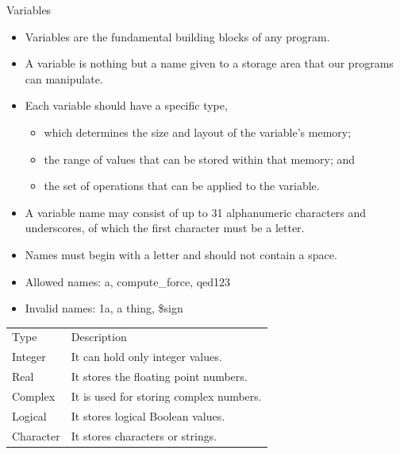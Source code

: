 \documentclass[10pt,t]{beamer}
\begin{document}
\begin{frame}{Variables}
  \begin{itemize}
  \item Variables are the fundamental building blocks of any program.
  \item A variable is nothing but a name given to a storage area that our programs can manipulate.
  \item Each variable should have a specific type,
    \begin{itemize}
    \item which determines the size and layout of the variable's memory;
    \item the range of values that can be stored within that memory; and
    \item the set of operations that can be applied to the variable.
    \end{itemize}
  \item A variable name may consist of up to 31 alphanumeric characters and underscores, of which the first character must be a letter.
  \item Names must begin with a letter and should not contain a space.
  \item Allowed names: a, compute\_force, qed123
  \item Invalid names: 1a, a thing, \$sign
  \end{itemize}
  \begin{center}
    \begin{tabular}{ll}
      \rowcolor{lublue}Type & Description \\
      \rowcolor{lulime!50}Integer & It can hold only integer values. \\
      \rowcolor{lulime}Real & It stores the floating point numbers. \\
      \rowcolor{lulime!50}Complex & It is used for storing complex numbers. \\
      \rowcolor{lulime}Logical & It stores logical Boolean values. \\
      \rowcolor{lulime!50 }Character & It stores characters or strings. \\
    \end{tabular}
  \end{center}
\end{frame}
\end{document}
